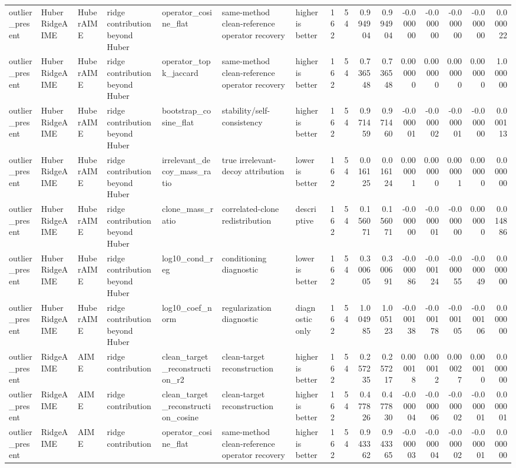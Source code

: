 \begin{table}[t]
\begin{tabular}{lllllllrrrrrrrrr}
outlier_present & HuberRidgeAIME & HuberAIME & ridge contribution beyond Huber & operator_cosine_flat & same-method clean-reference operator recovery & higher is better & 162 & 54 & 0.994904 & 0.994904 & -0.000000 & -0.000000 & -0.000000 & -0.000000 & 0.000022 \\
outlier_present & HuberRidgeAIME & HuberAIME & ridge contribution beyond Huber & operator_topk_jaccard & same-method clean-reference operator recovery & higher is better & 162 & 54 & 0.736548 & 0.736548 & 0.000000 & 0.000000 & 0.000000 & 0.000000 & 1.000000 \\
outlier_present & HuberRidgeAIME & HuberAIME & ridge contribution beyond Huber & bootstrap_cosine_flat & stability/self-consistency & higher is better & 162 & 54 & 0.971459 & 0.971460 & -0.000001 & -0.000002 & -0.000001 & -0.000000 & 0.000113 \\
outlier_present & HuberRidgeAIME & HuberAIME & ridge contribution beyond Huber & irrelevant_decoy_mass_ratio & true irrelevant-decoy attribution & lower is better & 162 & 54 & 0.016125 & 0.016124 & 0.000001 & 0.000000 & 0.000001 & 0.000000 & 0.000000 \\
outlier_present & HuberRidgeAIME & HuberAIME & ridge contribution beyond Huber & clone_mass_ratio & correlated-clone redistribution & descriptive & 162 & 54 & 0.156071 & 0.156071 & -0.000000 & -0.000001 & -0.000000 & 0.000000 & 0.014886 \\
outlier_present & HuberRidgeAIME & HuberAIME & ridge contribution beyond Huber & log10_cond_reg & conditioning diagnostic & lower is better & 162 & 54 & 0.300605 & 0.300691 & -0.000086 & -0.000124 & -0.000055 & -0.000049 & 0.000000 \\
outlier_present & HuberRidgeAIME & HuberAIME & ridge contribution beyond Huber & log10_coef_norm & regularization diagnostic & diagnostic only & 162 & 54 & 1.004985 & 1.005123 & -0.000138 & -0.000178 & -0.000105 & -0.000106 & 0.000000 \\
outlier_present & RidgeAIME & AIME & ridge contribution & clean_target_reconstruction_r2 & clean-target reconstruction & higher is better & 162 & 54 & 0.257235 & 0.257217 & 0.000018 & 0.000012 & 0.000027 & 0.000010 & 0.000000 \\
outlier_present & RidgeAIME & AIME & ridge contribution & clean_target_reconstruction_cosine & clean-target reconstruction & higher is better & 162 & 54 & 0.477826 & 0.477830 & -0.000004 & -0.000006 & -0.000002 & -0.000001 & 0.000001 \\
outlier_present & RidgeAIME & AIME & ridge contribution & operator_cosine_flat & same-method clean-reference operator recovery & higher is better & 162 & 54 & 0.943362 & 0.943365 & -0.000003 & -0.000004 & -0.000002 & -0.000001 & 0.000000 \\

\end{tabular}
\end{table}
